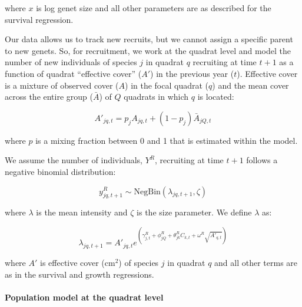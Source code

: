 \documentclass[12pt,]{article}
\begin{document}
where $x$ is log genet size and all other parameters are as described
for the survival regression.

Our data allows us to track new recruits, but we cannot assign a
specific parent to new genets. So, for recruitment, we work at the
quadrat level and model the number of new individuals of species $j$ in
quadrat $q$ recruiting at time $t+1$ as a function of quadrat
``effective cover'' ($A'$) in the previous year ($t$). Effective cover
is a mixture of observed cover ($A$) in the focal quadrat ($q$) and the
mean cover across the entire group ($\bar{A}$) of $Q$ quadrats in which
$q$ is located:

\begin{equation}
A'_{jq,t} = p_{j}A_{jq,t} + (1-p_{j})\bar{A}_{jQ,t}
\end{equation}

where $p$ is a mixing fraction between 0 and 1 that is estimated within
the model.

We assume the number of individuals, $Y^{R}$, recruiting at time $t+1$
follows a negative binomial distribution:

\begin{equation}
y^{R}_{jq,t+1} \sim \text{NegBin}(\lambda_{jq,t+1},\zeta)
\end{equation}

where $\lambda$ is the mean intensity and $\zeta$ is the size parameter.
We define $\lambda$ as:

\begin{equation}
\lambda_{jq,t+1} = A'_{jq,t}e^{(\gamma^{R}_{j,t} + \phi^{R}_{jQ} + \theta^{R}_{jk}C_{k,t} + \omega^{R}\sqrt{A'_{q,t}})}
\end{equation}

where $A'$ is effective cover ($\text{cm}^2$) of species $j$ in quadrat
$q$ and all other terms are as in the survival and growth regressions.

\paragraph{Population model at the quadrat
level}\label{population-model-at-the-quadrat-level}
\end{document}
